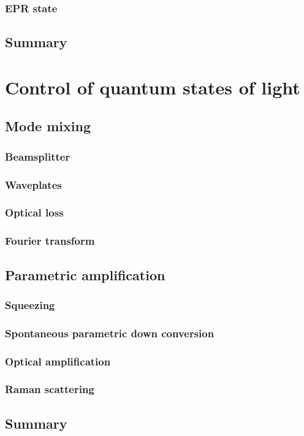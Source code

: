 \documentclass{book}
\begin{document}
\subsection{EPR state}
\section{Summary}

\chapter{Control of quantum states of light}
\section{Mode mixing}
\subsection{Beamsplitter}
\subsection{Waveplates}
\subsection{Optical loss}
\subsection{Fourier transform}
\section{Parametric amplification}
\subsection{Squeezing}
\subsection{Spontaneous parametric down conversion}
\subsection{Optical amplification}
\subsection{Raman scattering}
\section{Summary}
\end{document}
